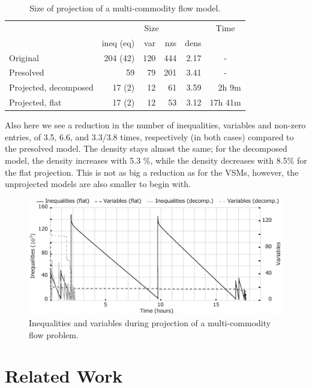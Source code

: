 \documentclass{llncs}
\newcommand{\btablesize}{\begin{scriptsize}}
\newcommand{\etablesize}{\end{scriptsize}}
\begin{document}
\begin{table}[b]
\caption{Size of projection of a multi-commodity flow model.}
\label{tab:multicom}
\centering
\btablesize
\begin{tabular}{l|r@{ / }r@{ / }r@{ / }r|r}
&\multicolumn{4}{c|}{Size}&\multicolumn{1}{c}{Time}\\
											&ineq (eq)&var &nzs &dens&\\
\hline
Original							&204 (42) & 120& 444&2.17&\multicolumn{1}{c}{-}\\
Presolved							& 59		  &  79& 201&3.41&\multicolumn{1}{c}{-}\\
Projected, decomposed	& 17 (2)  &  12&  61&3.59& 2h \phantom{9}9m \\
Projected, flat				& 17 (2)  &  12&  53&3.12& 17h 41m\\
\end{tabular}
\etablesize
\end{table}

Also here we see a reduction in the number of inequalities, variables and non-zero entries, of 3.5, 6.6, and 3.3/3.8 times, respectively (in both cases) compared to the presolved model. The density stays almost the same; for the decomposed model, the density increases with 5.3 \%, while the density decreases with 8.5\% for the flat projection.
This is not as big a reduction as for the VSMs, however, the unprojected models are also smaller to begin with. 
\begin{figure}[tb]
	\centering
		\includegraphics{figures/newMultiComGraph.pdf}
	\caption{Inequalities and variables during projection of a multi-commodity flow problem.}
	\label{fig:multicom}
\end{figure}

\section{Related Work}
\end{document}
